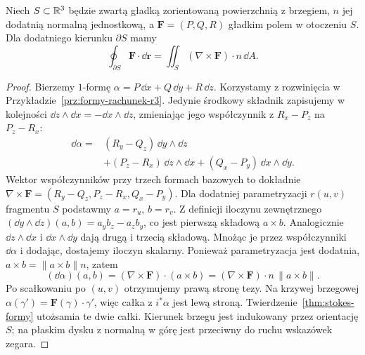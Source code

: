 \begin{wniosek}
\label{cor:stokes-curl}
Niech $S\subset\mathbb{R}^3$ będzie zwartą gładką
zorientowaną powierzchnią z brzegiem,
$n$ jej dodatnią normalną jednostkową,
a $\mathbf F=(P,Q,R)$ gładkim polem w otoczeniu $S$.
Dla dodatniego kierunku $\partial S$ mamy
\[
 \oint_{\partial S}\mathbf F\cdot\dd\mathbf r
 =\iint_S(\nabla\times\mathbf F)\cdot n\,\dd A.
\]
\end{wniosek}
\begin{proof}
Bierzemy $1$-formę
$\alpha=P\,\dd x+Q\,\dd y+R\,\dd z$.
Korzystamy z rozwinięcia w
Przykładzie~\ref{prz:formy-rachunek-r3}.
Jedynie środkowy składnik zapisujemy w kolejności
$\dd z\wedge\dd x=-\dd x\wedge\dd z$,
zmieniając jego współczynnik z $R_x-P_z$ na $P_z-R_x$:
\[
 \begin{aligned}
 \dd\alpha={}&(R_y-Q_z)\,\dd y\wedge\dd z\\
 &+(P_z-R_x)\,\dd z\wedge\dd x
 +(Q_x-P_y)\,\dd x\wedge\dd y.
 \end{aligned}
\]
Wektor współczynników przy trzech formach
bazowych to dokładnie
$\nabla\times\mathbf F
=(R_y-Q_z,P_z-R_x,Q_x-P_y)$.
Dla dodatniej parametryzacji
$r(u,v)$ fragmentu $S$ podstawmy
$a=r_u$, $b=r_v$. Z definicji iloczynu
zewnętrznego
$(\dd y\wedge\dd z)(a,b)=a_yb_z-a_zb_y$,
co jest pierwszą składową $a\times b$.
Analogicznie $\dd z\wedge\dd x$ i $\dd x\wedge\dd y$
dają drugą i trzecią składową. Mnożąc je przez współczynniki
$\dd\alpha$ i dodając, dostajemy iloczyn skalarny.
Ponieważ parametryzacja jest dodatnia,
$a\times b=\|a\times b\|n$, zatem
\[
 (\dd\alpha)(a,b)
 =(\nabla\times\mathbf F)\cdot(a\times b)
 =(\nabla\times\mathbf F)\cdot n\,
    \lVert a\times b\rVert.
\]
Po scałkowaniu po $(u,v)$ otrzymujemy prawą
stronę tezy. Na krzywej brzegowej
$\alpha(\gamma')=\mathbf F(\gamma)\cdot\gamma'$,
więc całka z $i^*\alpha$ jest lewą stroną.
Twierdzenie~\ref{thm:stokes-formy} utożsamia
te dwie całki. Kierunek brzegu jest
indukowany przez orientację $S$; na płaskim
dysku z normalną w górę jest przeciwny
do ruchu wskazówek zegara.
\end{proof}

